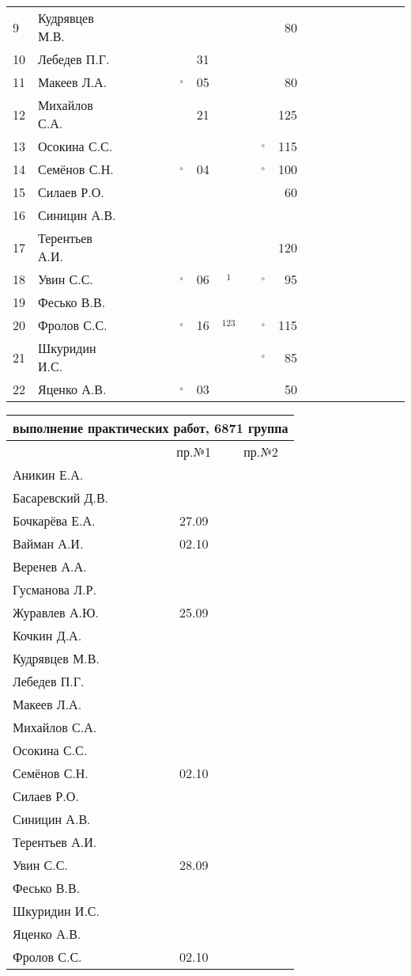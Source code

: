 \documentclass[a4paper,11pt]{article}
\newcommand*\OK{&\small \ding{51}$\!\!_\circ$} %
\newcommand*\ok{&{\small \ding{51}}} %
\newcommand*\no{&{\small }} %
\newcommand*\da{&{\small\ding{48}$\!\!_1$}} %
\newcommand*\dabc{&{\small\ding{48}$\!\!_{123}$}} %
\begin{document}
\begin{tabular}{l|l|cccccccccrcccccccc}
 9&Кудрявцев М.В.  \no\no\ok\ok\no\no\no  \ok\ok& 80&&&&&&&&\\
10&Лебедев П.Г.    \ok\ok\no\ok\ok&31\no  \ok\no \no&&&&&&&&\\
11&Макеев Л.А.     \ok\ok\ok\ok\OK&05\ok  \ok\ok& 80&&&&&&&&\\
12&Михайлов С.А.   \no\no\ok\ok\ok&21\no  \ok\ok&125&&&&&&&&\\
13&Осокина С.С.    \ok\ok\ok\ok\no\no\ok  \ok\OK&115&&&&&&&&\\
14&Семёнов С.Н.    \ok\ok\ok\ok\OK&04\ok  \ok\OK&100&&&&&&&&\\
15&Силаев Р.О.     \ok\ok\no\no\no\no\no  \no\ok& 60&&&&&&&&\\
16&Синицин А.В.    \ok\ok\no\ok\no\no\no  \no\no \no&&&&&&&&\\
17&Терентьев А.И.  \ok\ok\ok\ok\no\no\no  \no\ok&120&&&&&&&&\\
18&Увин С.С.       \ok\ok\ok\ok\OK&06\da  \ok\OK& 95&&&&&&&&\\
19&Фесько В.В.     \no\no\no\no\no\no\no  \no\no \no&&&&&&&&\\
20&Фролов С.С.     \ok\ok\ok\ok\OK&16\dabc\ok\OK&115&&&&&&&&\\ 
21&Шкуридин И.С.   \ok\ok\ok\ok\ok\no\ok  \ok\OK& 85&&&&&&&&\\
22&Яценко А.В.     \ok\ok\ok\ok\OK&03\ok  \ok\ok& 50&&&&&&&&\\ 
\bottomrule
\end{tabular} 
\newpage

\begin{tabular}{l|cc}
\multicolumn{3}{c}{выполнение практических работ, 6871 группа} \\
\toprule
& пр.№1 & пр.№2 \\
\midrule
Аникин Е.А.     &     &\\    
Басаревский Д.В.&     &\\
Бочкарёва Е.А.  &27.09&\\
Вайман А.И.     &02.10&\\
Веренев А.А.    &     &\\
Гусманова Л.Р.  &     &\\
Журавлев А.Ю.   &25.09&\\
Кочкин Д.А.     &     &\\
Кудрявцев М.В.  &     &\\
Лебедев П.Г.    &     &\\
Макеев Л.А.     &     &\\
Михайлов С.А.   &     &\\
Осокина С.С.    &     &\\
Семёнов С.Н.    &02.10&\\
Силаев Р.О.     &     &\\
Синицин А.В.    &     &\\
Терентьев А.И.  &     &\\
Увин С.С.       &28.09&\\
Фесько В.В.     &     &\\
Шкуридин И.С.   &     &\\
Яценко А.В.     &     &\\
Фролов С.С.     &02.10&\\
\bottomrule
\end{tabular}
\end{document}
